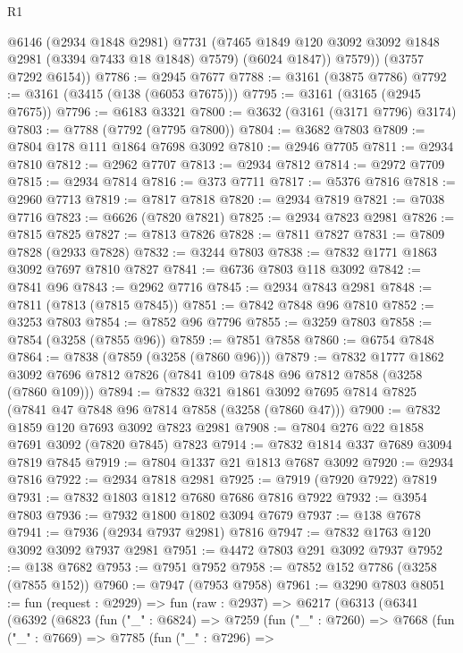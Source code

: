 \begin{lexlean}{R1}
\begin{coremodule}
            @6146
            (@2934 @1848 @2981)
            @7731
            (@7465 @1849 @120 @3092 @3092 @1848 @2981 (@3394 @7433 @18 @1848) @7579)
            (@6024 @1847))
          @7579))
      (@3757 @7292 @6154))
@7786 := @2945 @7677
@7788 := @3161 (@3875 @7786)
@7792 := @3161 (@3415 (@138 (@6053 @7675)))
@7795 := @3161 (@3165 (@2945 @7675))
@7796 := @6183 @3321
@7800 := @3632 (@3161 (@3171 @7796) @3174)
@7803 := @7788 (@7792 (@7795 @7800))
@7804 := @3682 @7803
@7809 := @7804 @178 @111 @1864 @7698 @3092
@7810 := @2946 @7705
@7811 := @2934 @7810
@7812 := @2962 @7707
@7813 := @2934 @7812
@7814 := @2972 @7709
@7815 := @2934 @7814
@7816 := @373 @7711
@7817 := @5376 @7816
@7818 := @2960 @7713
@7819 := @7817 @7818
@7820 := @2934 @7819
@7821 := @7038 @7716
@7823 := @6626 (@7820 @7821)
@7825 := @2934 @7823 @2981
@7826 := @7815 @7825
@7827 := @7813 @7826
@7828 := @7811 @7827
@7831 := @7809 @7828 (@2933 @7828)
@7832 := @3244 @7803
@7838 := @7832 @1771 @1863 @3092 @7697 @7810 @7827
@7841 := @6736 @7803 @118 @3092
@7842 := @7841 @96
@7843 := @2962 @7716
@7845 := @2934 @7843 @2981
@7848 := @7811 (@7813 (@7815 @7845))
@7851 := @7842 @7848 @96 @7810
@7852 := @3253 @7803
@7854 := @7852 @96 @7796
@7855 := @3259 @7803
@7858 := @7854 (@3258 (@7855 @96))
@7859 := @7851 @7858
@7860 := @6754 @7848
@7864 := @7838 (@7859 (@3258 (@7860 @96)))
@7879 := @7832
    @1777
    @1862
    @3092
    @7696
    @7812
    @7826
    (@7841 @109 @7848 @96 @7812 @7858 (@3258 (@7860 @109)))
@7894 := @7832
    @321
    @1861
    @3092
    @7695
    @7814
    @7825
    (@7841 @47 @7848 @96 @7814 @7858 (@3258 (@7860 @47)))
@7900 := @7832 @1859 @120 @7693 @3092 @7823 @2981
@7908 := @7804 @276 @22 @1858 @7691 @3092 (@7820 @7845) @7823
@7914 := @7832 @1814 @337 @7689 @3094 @7819 @7845
@7919 := @7804 @1337 @21 @1813 @7687 @3092
@7920 := @2934 @7816
@7922 := @2934 @7818 @2981
@7925 := @7919 (@7920 @7922) @7819
@7931 := @7832 @1803 @1812 @7680 @7686 @7816 @7922
@7932 := @3954 @7803
@7936 := @7932 @1800 @1802 @3094 @7679
@7937 := @138 @7678
@7941 := @7936 (@2934 @7937 @2981) @7816
@7947 := @7832 @1763 @120 @3092 @3092 @7937 @2981
@7951 := @4472 @7803 @291 @3092 @7937
@7952 := @138 @7682
@7953 := @7951 @7952
@7958 := @7852 @152 @7786 (@3258 (@7855 @152))
@7960 := @7947 (@7953 @7958)
@7961 := @3290 @7803
@8051 := fun (request : @2929) =>
  fun (raw : @2937) =>
  @6217
    (@6313
      (@6341
        (@6392
          (@6823
            (fun ("_" : @6824) =>
            @7259
              (fun ("_" : @7260) =>
              @7668
                (fun ("_" : @7669) =>
                @7785
                  (fun ("_" : @7296) =>

\end{coremodule}
\end{lexlean}
